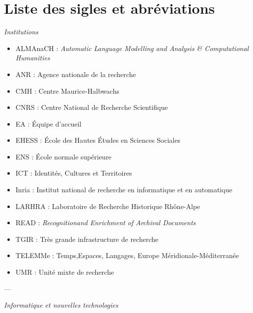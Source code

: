 \chapter*{Liste des sigles et abréviations}

\begin{center}
\textit{Institutions}
\end{center} 

\begin{itemize}
    \item ALMAnaCH : \textit{Automatic Language Modelling and Analysis \& Computational Humanities}
    \item ANR : Agence nationale de la recherche
    \item CMH : Centre Maurice-Halbwachs
    \item CNRS : Centre National de Recherche Scientifique
    \item EA : Équipe d'accueil
    \item EHESS : École des Hautes Études en Sciences Sociales
    \item ENS : École normale supérieure
    \item ICT : Identités, Cultures et Territoires
    \item Inria : Institut national de recherche en informatique et en automatique
    \item LARHRA : Laboratoire de Recherche Historique Rhône-Alpe
    \item READ : \textit{Recognitionand Enrichment of Archival Documents}
    \item TGIR : Très grande infrastructure de recherche
    \item TELEMMe : Temps,Espaces, Langages, Europe Méridionale-Méditerranée
    \item UMR : Unité mixte de recherche
\end{itemize}

\bigbreak

\begin{center}---

\bigbreak

\textit{Informatique et nouvelles technologies}
\end{center} 

\bigbreak

